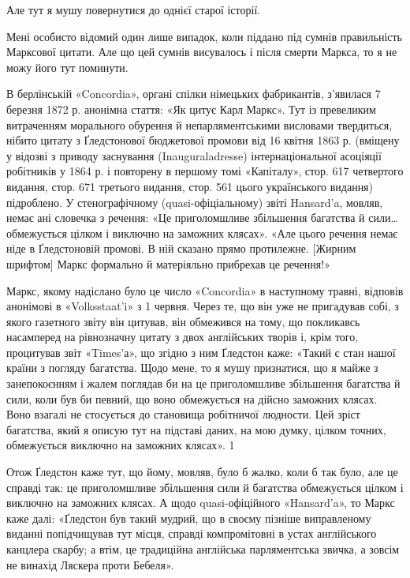 Але тут я мушу повернутися до однієї старої історії.

Мені особисто відомий один лише випадок, коли піддано під
сумнів правильність Марксової цитати. Але що цей сумнів висувалось
і після смерти Маркса, то я не можу його тут поминути.

В берлінській «Concordia», органі спілки німецьких фабрикантів,
з’явилася 7 березня 1872 р. анонімна стаття: «Як цитує
Карл Маркс». Тут із превеликим витраченням морального обурення
й непарляментськими висловами твердиться, нібито цитату
з Ґледстонової бюджетової промови від 16 квітня 1863 р.
(вміщену у відозві з приводу заснування (Inauguraladresse) інтернаціональної
асоціяції робітників у 1864 р. і повторену в першому
томі «Капіталу», стор. 617 четвертого видання, стор. 671 третього
видання, стор. 561 цього українського видання) підроблено.
У стенографічному (quasi-офіціальному) звіті Hansard’a,
мовляв, немає ані словечка з речення: «Це приголомшливе збільшення
багатства й сили\dots{} обмежується цілком і виключно на
заможних клясах». «Але цього речення немає ніде в Ґледстоновій
промові. В ній сказано прямо протилежне. [Жирним
шрифтом] Маркс формально й матеріяльно прибрехав це речення!»

Маркс, якому надіслано було це число «Concordia» в наступному
травні, відповів анонімові в «Volksstaat’i» з 1 червня. Через
те, що він уже не пригадував собі, з якого газетного звіту він цитував,
він обмежився на тому, що покликавсь насамперед на рівнозначну
цитату з двох англійських творів і, крім того, процитував
звіт «Times’а», що згідно з ним Ґледстон каже: «Такий є
стан нашої країни з погляду багатства. Щодо мене, то я мушу
признатися, що я майже з занепокоєнням і жалем поглядав би на
це приголомшливе збільшення багатства й сили, коли був би певний,
що воно обмежується на дійсно заможних клясах. Воно
взагалі не стосується до становища робітничої людности. Цей
зріст багатства, який я описую тут на підставі даних, на мою
думку, цілком точних, обмежується виключно на заможних
клясах». 1

Отож Ґледстон каже тут, що йому, мовляв, було б жалко,
коли б так було, але це справді так: це приголомшливе збільшення
сили й багатства обмежується цілком і виключно на заможних
клясах. А щодо quasi-офіційного «Hansard’a», то Маркс каже
далі: «Ґледстон був такий мудрий, що в своєму пізніше виправленому
виданні попідчищував тут місця, справді компромітовні
в устах англійського канцлера скарбу; а втім, це традиційна
англійська парляментська звичка, а зовсім не винахід Ляскера
проти Бебеля».

